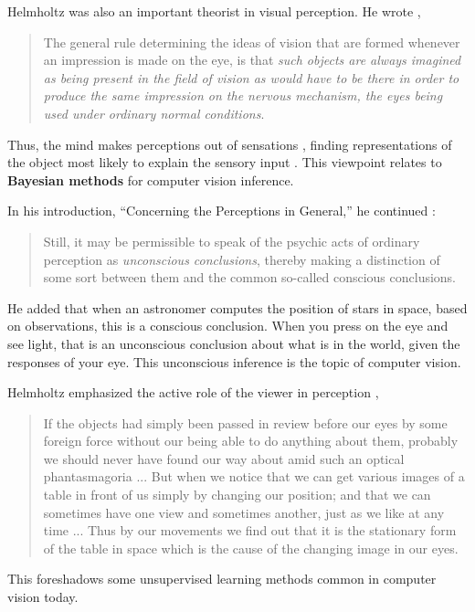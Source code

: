 Helmholtz was also an important theorist in visual perception.  He wrote \cite{Helmholtz62}, 
\begin{quote}
The general rule determining the ideas of vision that are formed whenever an impression is made on the eye, is that {\em such objects are always imagined as being present in the field of vision as would have to be there in order to produce the same impression on the nervous mechanism, the eyes being used under ordinary normal conditions}.
\end{quote}

Thus, the mind makes perceptions out of sensations \cite{Shapin2019}, finding representations of the object most likely to explain the sensory input \cite{Wandell95}.  This viewpoint relates to {\bf Bayesian methods} for computer vision inference.

In his introduction, ``Concerning the Perceptions in General,'' he continued \cite{Helmholtz62}:
\begin{quote}
Still, it may be permissible to speak of the psychic acts of ordinary perception as {\em unconscious conclusions}, thereby making a distinction of some sort between them and the common so-called conscious conclusions.
\end{quote}
He added that when an astronomer computes the position of stars in space, based on observations, this is a conscious conclusion. When you press on the eye and see light, that is an unconscious conclusion about what is in the world, given the responses of your eye. This unconscious inference is the topic of computer vision.


Helmholtz emphasized the active role of the viewer in perception \cite{Helmholtz62},
\begin{quote}
If the objects had simply been passed in review before our eyes by some foreign force without our being able to do anything about them, probably we should never have found our way about amid such an optical phantasmagoria ... But when we notice that we can get various images of a table in front of us simply by changing our position; and that we can sometimes have one view and sometimes another, just as we like at any time ... Thus by our movements we find out that it is the stationary form of the table in space which is the cause of the changing image in our eyes.
\end{quote}
This foreshadows some unsupervised learning methods common in computer vision today.


